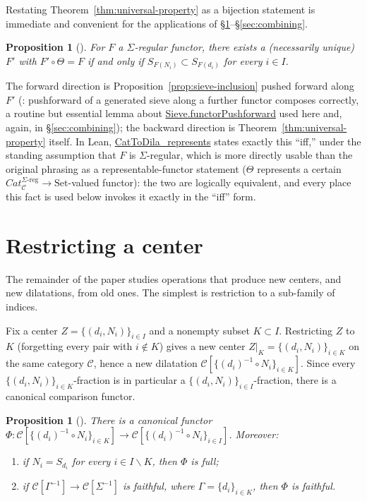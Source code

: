 \documentclass[11pt]{amsart}
\newcommand{\lc}[1]{\url{#1}}
\theoremstyle{plain}
\newtheorem{proposition}[theorem]{Proposition}
\theoremstyle{definition}
\theoremstyle{remark}
\newcommand{\calC}{\mathcal C}
\begin{document}
Restating Theorem~\ref{thm:universal-property} as a bijection statement is immediate and
convenient for the applications of \S\ref{sec:restriction}--\S\ref{sec:combining}.

\begin{proposition}[{\citep[Proposition~3.12]{Mayeux}}]
For $F$ a $\Sigma$-regular functor, there exists a (necessarily unique) $F'$ with
$F' \circ \Theta = F$ if and only if $S_{F(N_i)} \subset S_{F(d_i)}$ for every $i \in I$.
\end{proposition}

The forward direction is Proposition~\ref{prop:sieve-inclusion} pushed forward along $F'$
(\citep[Fact~3.11]{Mayeux}: pushforward of a generated sieve along a further functor composes correctly, a
routine but essential lemma about \lc{Sieve.functorPushforward} used here and, again, in
\S\ref{sec:combining}); the backward direction is Theorem~\ref{thm:universal-property}
itself. In Lean, \lc{CatToDila_represents} states exactly this ``iff,'' under the standing
assumption that $F$ is $\Sigma$-regular, which is more directly usable than the original
phrasing as a representable-functor statement ($\Theta$ represents a certain
$Cat_\calC^{\Sigma\text{-reg}} \to \mathrm{Set}$-valued functor): the two are logically
equivalent, and every place this fact is used below invokes it exactly in the ``iff'' form.

\section{Restricting a center}
\label{sec:restriction}

The remainder of the paper studies operations that produce new centers, and new dilatations,
from old ones. The simplest is restriction to a sub-family of indices.

Fix a center $Z=\{(d_i,N_i)\}_{i\in I}$ and a nonempty subset $K \subset I$. Restricting $Z$
to $K$ (forgetting every pair with $i \notin K$) gives a new center
$Z|_K = \{(d_i,N_i)\}_{i\in K}$ on the same category $\calC$, hence a new dilatation
$\calC[\{(d_i)^{-1}\circ N_i\}_{i\in K}]$. Since every $\{(d_i,N_i)\}_{i\in K}$-fraction is in
particular a $\{(d_i,N_i)\}_{i\in I}$-fraction, there is a canonical comparison functor.

\begin{proposition}[{\citep[Proposition~3.14]{Mayeux}}]
\label{prop:restriction}
There is a canonical functor $\Phi : \calC[\{(d_i)^{-1}\circ N_i\}_{i\in K}] \to
\calC[\{(d_i)^{-1}\circ N_i\}_{i\in I}]$. Moreover:
\begin{enumerate}
\item[(i)] \label{prop:restriction-full} if $N_i = S_{d_i}$ for every $i \in I \smallsetminus K$, then $\Phi$ is full;
\item[(ii)] if $\calC[\Gamma^{-1}] \to \calC[\Sigma^{-1}]$ is faithful, where
  $\Gamma = \{d_i\}_{i\in K}$, then $\Phi$ is faithful.
\end{enumerate}
\end{proposition}
\end{document}
